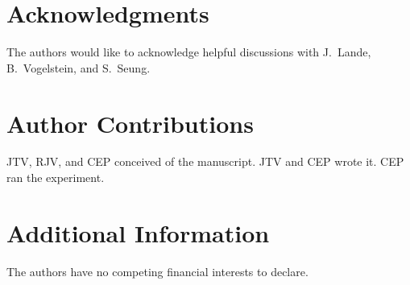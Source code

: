 \documentclass{article}
\newcommand{\hL}{\widehat{L}}
\begin{document}








\clearpage



\section*{Acknowledgments}

The authors would like to acknowledge helpful discussions with J.~Lande, B.~Vogelstein, and S.~Seung. 

\section*{Author Contributions}

JTV, RJV, and CEP conceived of the manuscript.  JTV and CEP wrote it.  CEP ran the experiment.

\section*{Additional Information}

The authors have no competing financial interests to declare.
\end{document}
